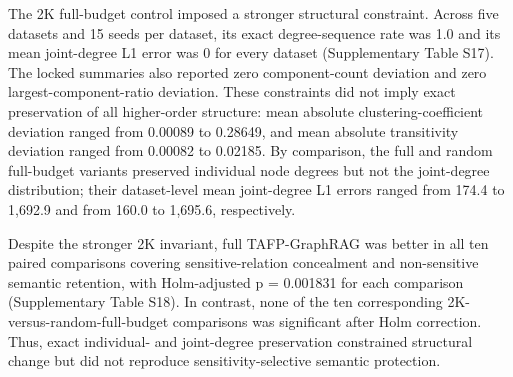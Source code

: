 \documentclass[preprint,12pt]{elsarticle}
\begin{document}
The 2K full-budget control imposed a stronger structural constraint. Across five datasets and 15 seeds per dataset, its exact degree-sequence rate was 1.0 and its mean joint-degree L1 error was 0 for every dataset (Supplementary Table S17). The locked summaries also reported zero component-count deviation and zero largest-component-ratio deviation. These constraints did not imply exact preservation of all higher-order structure: mean absolute clustering-coefficient deviation ranged from 0.00089 to 0.28649, and mean absolute transitivity deviation ranged from 0.00082 to 0.02185. By comparison, the full and random full-budget variants preserved individual node degrees but not the joint-degree distribution; their dataset-level mean joint-degree L1 errors ranged from 174.4 to 1,692.9 and from 160.0 to 1,695.6, respectively.

Despite the stronger 2K invariant, full TAFP-GraphRAG was better in all ten paired comparisons covering sensitive-relation concealment and non-sensitive semantic retention, with Holm-adjusted p = 0.001831 for each comparison (Supplementary Table S18). In contrast, none of the ten corresponding 2K-versus-random-full-budget comparisons was significant after Holm correction. Thus, exact individual- and joint-degree preservation constrained structural change but did not reproduce sensitivity-selective semantic protection.
\end{document}
